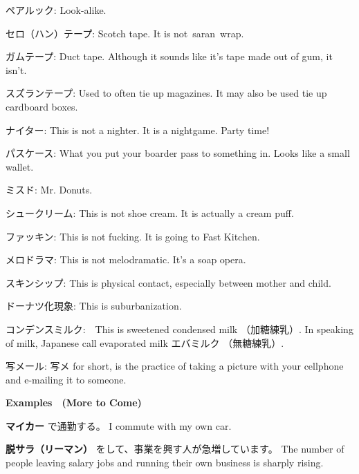 \par{ペアルック: Look-alike. }

\par{セロ（ハン）テープ: Scotch tape. It is not saran wrap. }

\par{ガムテープ: Duct tape. Although it sounds like it's tape made out of gum, it isn't. }

\par{スズランテープ: Used to often tie up magazines. It may also be used tie up cardboard boxes. }

\par{ナイター: This is not a nighter. It is a nightgame. Party time! }

\par{パスケース: What you put your boarder pass to something in. Looks like a small wallet. }

\par{ミスド: Mr. Donuts. }

\par{シュークリーム: This is not shoe cream. It is actually a cream puff. }

\par{ファッキン: This is not fucking. It is going to Fast Kitchen. }

\par{メロドラマ: This is not melodramatic. It's a soap opera. }

\par{スキンシップ: This is physical contact, especially between mother and child. }

\par{ドーナツ化現象: This is suburbanization. }

\par{コンデンスミルク:　This is sweetened condensed milk （加糖練乳）. In speaking of milk, Japanese call evaporated milk エバミルク （無糖練乳）. }

\par{写メール: 写メ for short, is the practice of taking a picture with your cellphone and e-mailing it to someone. }

\begin{center}
 \textbf{Examples　(More to Come) }
\end{center}

\par{\textbf{マイカー }で通勤する。 \hfill\break
I commute with my own car. }

\par{\textbf{脱サラ（リーマン） }をして、事業を興す人が急増しています。 \hfill\break
The number of people leaving salary jobs and running their own business is sharply rising. }
    